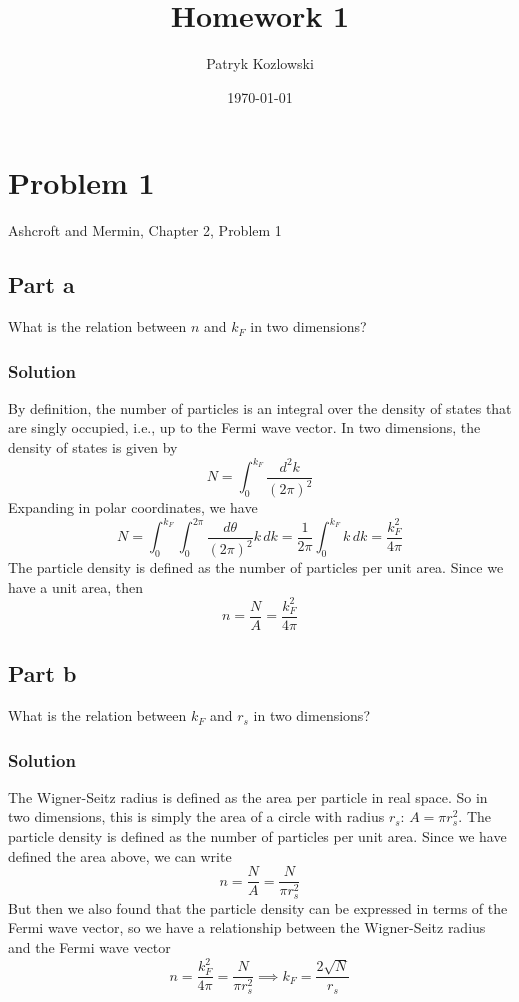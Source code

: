 \documentclass[12pt]{article}
\author{Patryk Kozlowski}
\title{Homework 1}
\date{\today}
\begin{document}
\maketitle
\section{Problem 1}
Ashcroft and Mermin, Chapter 2, Problem 1
\subsection{Part a}
What is the relation between $n$ and $k_F$ in two dimensions?
\subsubsection{Solution}
By definition, the number of particles is an integral over the density of states that are singly occupied, i.e., up to the Fermi wave vector. In two dimensions, the density of states is given by
\begin{equation}
    N = \int_{0}^{k_F} \frac{d^2k}{(2\pi)^2}
\end{equation}
Expanding in polar coordinates, we have
\begin{equation}
    N = \int_{0}^{k_F} \int_{0}^{2\pi } \frac{d\theta}{(2\pi)^2} k \, dk = \frac{1}{2\pi}\int_{0}^{k_F} k \, dk = \frac{k_F^2}{4\pi}
\end{equation}
The particle density is defined as the number of particles per unit area. Since we have a unit area, then
\begin{equation}
    n = \frac{N}{A} = \frac{k_F^2}{4\pi}
\end{equation}
\subsection{Part b}
What is the relation between $k_F$ and $r_s$ in two dimensions?
\subsubsection{Solution}
The Wigner-Seitz radius is defined as the area per particle in real space. So in two dimensions, this is simply the area of a circle with radius $r_s$: $A = \pi r_s^2$. The particle density is defined as the number of particles per unit area. Since we have defined the area above, we can write
\begin{equation}
    n = \frac{N}{A} = \frac{N}{\pi r_s^2}  
\end{equation}
But then we also found that the particle density can be expressed in terms of the Fermi wave vector, so we have a relationship between the Wigner-Seitz radius and the Fermi wave vector
\begin{equation}
    n = \frac{k_F^2}{4\pi} = \frac{N}{\pi r_s^2} \implies k_F = \frac{2\sqrt{N}}{r_s}
\end{equation}
\end{document}
